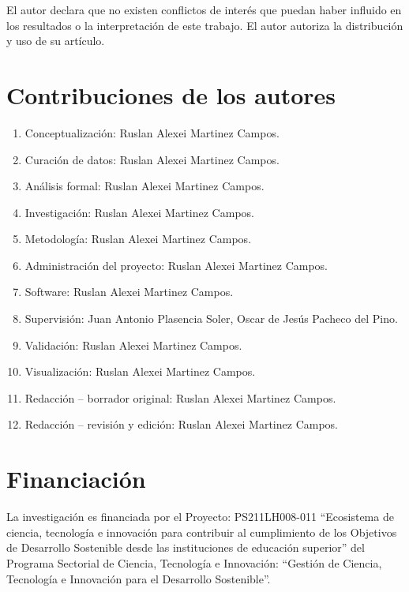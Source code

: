 \documentclass[12pt,a4paper]{article}
\begin{document}
El autor declara que no existen conflictos de interés que puedan haber influido en los resultados o la interpretación de este trabajo. El autor autoriza la distribución y uso de su artículo.

\section*{Contribuciones de los autores}

\begin{enumerate}
    \item Conceptualización: Ruslan Alexei Martinez Campos.
    \item Curación de datos: Ruslan Alexei Martinez Campos.
    \item Análisis formal: Ruslan Alexei Martinez Campos.
    \item Investigación: Ruslan Alexei Martinez Campos.
    \item Metodología: Ruslan Alexei Martinez Campos.
    \item Administración del proyecto: Ruslan Alexei Martinez Campos.
    \item Software: Ruslan Alexei Martinez Campos.
    \item Supervisión: Juan Antonio Plasencia Soler, Oscar de Jesús Pacheco del Pino.
    \item Validación: Ruslan Alexei Martinez Campos.
    \item Visualización: Ruslan Alexei Martinez Campos.
    \item Redacción -- borrador original: Ruslan Alexei Martinez Campos.
    \item Redacción -- revisión y edición: Ruslan Alexei Martinez Campos.
\end{enumerate}

\section*{Financiación}

La investigación es financiada por el Proyecto: PS211LH008-011 ``Ecosistema de ciencia, tecnología e innovación para contribuir al cumplimiento de los Objetivos de Desarrollo Sostenible desde las instituciones de educación superior'' del Programa Sectorial de Ciencia, Tecnología e Innovación: ``Gestión de Ciencia, Tecnología e Innovación para el Desarrollo Sostenible''.
\end{document}
